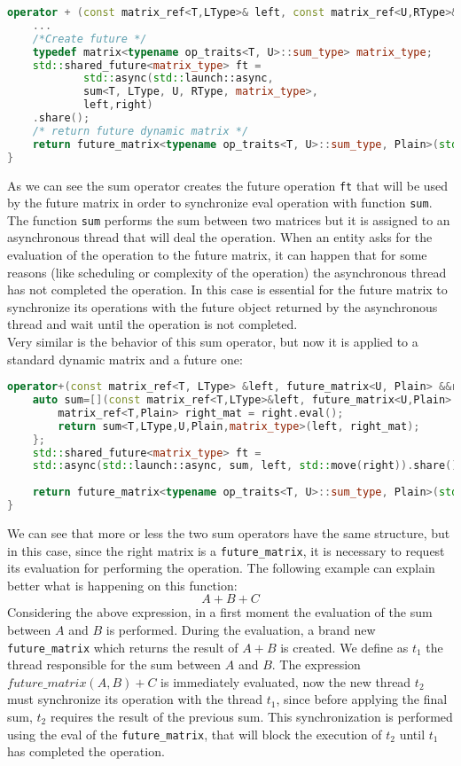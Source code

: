 \documentclass[10pt,a4paper]{article}
\begin{document}
\begin{lstlisting}[language= C++]
operator + (const matrix_ref<T,LType>& left, const matrix_ref<U,RType>& right) {
	...
	/*Create future */
	typedef matrix<typename op_traits<T, U>::sum_type> matrix_type;
	std::shared_future<matrix_type> ft = 
			std::async(std::launch::async, 
			sum<T, LType, U, RType, matrix_type>,
			left,right)
	.share();
	/* return future dynamic matrix */
	return future_matrix<typename op_traits<T, U>::sum_type, Plain>(std::move(ft), left.get_height(), left.get_width());
}
\end{lstlisting}
As we can see the sum operator creates the future operation \verb|ft| that will be used by the future matrix in order to synchronize eval operation with function \verb|sum|. The function \verb|sum| performs the sum between two matrices but it is assigned to an asynchronous thread that will deal the operation. When an entity asks for the evaluation of the operation to the future matrix, it can happen that for some reasons (like scheduling or complexity of the operation) the asynchronous thread has not completed the operation. In this case is essential for the future matrix to synchronize its operations with the future object returned by the asynchronous thread and wait until the operation is not completed.\\
Very similar is the behavior of this sum operator, but now it is applied to a standard dynamic matrix and a future one:
\begin{lstlisting}[language=C++]
operator+(const matrix_ref<T, LType> &left, future_matrix<U, Plain> &&right) {
	auto sum=[](const matrix_ref<T,LType>&left, future_matrix<U,Plain> &&right){
		matrix_ref<T,Plain> right_mat = right.eval();
		return sum<T,LType,U,Plain,matrix_type>(left, right_mat);
	};
	std::shared_future<matrix_type> ft = 
	std::async(std::launch::async, sum, left, std::move(right)).share();
	
	return future_matrix<typename op_traits<T, U>::sum_type, Plain>(std::move(ft), left.get_height(), left.get_width());
}
\end{lstlisting}
We can see that more or less the two sum operators have the same structure, but in this case, since the right matrix is a \verb|future_matrix|, it is necessary to request its evaluation for performing the operation. The following example can explain better what is happening on this function:
$$A + B + C$$
Considering the above expression, in a first moment the evaluation of the sum between $A$ and $B$ is performed. During the evaluation, a brand new \verb|future_matrix| which returns the result of $A+B$ is created. We define as $t_1$ the thread responsible for the sum between $A$ and $B$. The expression $future\_matrix(A,B) + C$ is immediately evaluated, now the new thread $t_2$ must synchronize its operation with the thread $t_1$, since before applying the final sum, $t_2$ requires the result of the previous sum. This synchronization is performed using the eval of the \verb|future_matrix|, that will block the execution of $t_2$ until $t_1$ has completed the operation.\\
\end{document}
